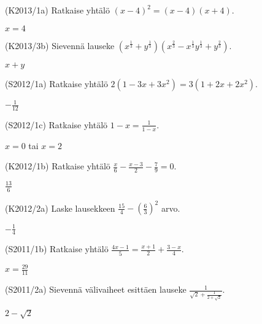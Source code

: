 \begin{multicols}{2}
\begin{tehtava} (K2013/1a) Ratkaise yhtälö $(x-4)^2=(x-4)(x+4)$.
	\begin{vastaus}
	$x=4$
	\end{vastaus}
\end{tehtava}

\begin{tehtava}
	(K2013/3b) Sievennä lauseke $(x^\frac{1}{3} + y^\frac{1}{3})(x^\frac{2}{3} - x^\frac{1}{3}y^\frac{1}{3} + y^\frac{2}{3})$.
		\begin{vastaus}
		$x+y$
		\end{vastaus}
\end{tehtava}
						
\begin{tehtava} (S2012/1a) Ratkaise yhtälö $2(1-3x+3x^2)=3(1+2x+2x^2)$.
	\begin{vastaus}
		$-\frac{1}{12}$
	\end{vastaus}
\end{tehtava}

\begin{tehtava}(S2012/1c) Ratkaise yhtälö $1-x=\frac{1}{1-x}$.
	\begin{vastaus}
				$x=0$ tai $x=2$
	\end{vastaus}
\end{tehtava}

\begin{tehtava}(K2012/1b) Ratkaise yhtälö $\frac{x}{6} - \frac{x-3}{2} - \frac{7}{9} = 0$. 
	\begin{vastaus}
				$\frac{13}{6}$
	\end{vastaus}
\end{tehtava}

\begin{tehtava}(K2012/2a) Laske lausekkeen $ \frac{15}{4} - \left( \frac{6}{3} \right)^2 $ arvo.
	\begin{vastaus}
				$-\frac{1}{4}$
	\end{vastaus}
\end{tehtava}

\begin{tehtava}(S2011/1b) Ratkaise yhtälö $\frac{4x - 1}{5} = \frac{x + 1}{2} + \frac{3 - x}{4}$.
	\begin{vastaus}
				$x=\frac{29}{11}$
	\end{vastaus}
\end{tehtava}

\begin{tehtava}(S2011/2a) Sievennä välivaiheet esittäen lauseke $\frac{1}{\sqrt{2} + \frac{1}{2 + \sqrt{2}}}$.
	\begin{vastaus}
				$2-\sqrt{2}$
	\end{vastaus}
\end{tehtava}


\end{multicols}
